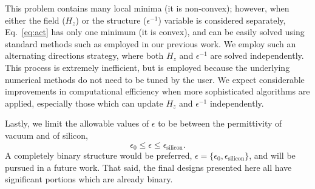 \documentclass[letterpaper,10pt]{article}
\begin{document}
This problem contains many local minima (it is non-convex\cite{boydbook});
    however, when either the field ($H_z$) or the structure ($\epsilon^{-1}$)
    variable is considered separately, Eq.~\ref{eq:act} has only one minimum
    (it is convex), and can be easily solved using standard methods
    such as employed in our previous work\cite{prevwork}.
We employ such an alternating directions strategy,
    where both $H_z$ and $\epsilon^{-1}$ are solved independently.
This process is extremely inefficient,
    but is employed because the underlying numerical methods
    do not need to be tuned by the user.
We expect considerable improvements in computational efficiency
    when more sophisticated algorithms are applied,
    especially those which can update $H_z$ and $\epsilon^{-1}$ independently.
    
Lastly, we limit the allowable values of $\epsilon$ to be between
    the permittivity of vacuum and of silicon,
    \begin{equation}
    \epsilon_0 \le \epsilon \le \epsilon_\text{silicon}.
    \end{equation}
A completely binary structure would be preferred,
    $\epsilon = \{\epsilon_0, \epsilon_\text{silicon}\}$,
    and will be pursued in a future work.
That said, the final designs presented here 
    all have significant portions which are already binary.
\end{document}
